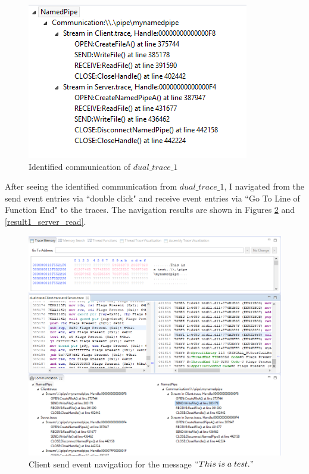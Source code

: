 \begin{figure}[H]
\centerline{\includegraphics{Figures/result1_communications}}
 \caption{Identified communication of $dual\_trace\_1$}
\label{result1_communications}
\end{figure}


After seeing the identified communication from $dual\_trace\_1$, I navigated from the send event entries via ``double click" and receive event entries via ``Go To Line of Function End" to the traces. The navigation results are shown in Figures \ref{result1_client_send} and \ref{result1_server_read}.

\begin{figure}
\includegraphics[width=\textwidth]{Figures/result1_client_send}
 \caption{Client send event navigation for the message $``This\; is\; a\; test."$}
\label{result1_client_send}
\end{figure}

